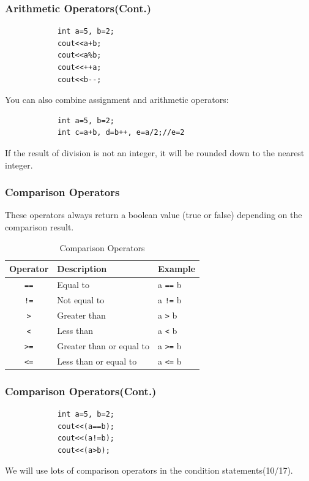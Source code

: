 \documentclass[xcolor=dvipsnames]{beamer}
\begin{document}
    \begin{frame}[fragile]
        \frametitle{Arithmetic Operators(Cont.)}
        \begin{verbatim}
            int a=5, b=2;
            cout<<a+b;
            cout<<a%b;
            cout<<++a;
            cout<<b--;
        \end{verbatim}
        You can also combine assignment and arithmetic operators:
        \begin{verbatim}
            int a=5, b=2;
            int c=a+b, d=b++, e=a/2;//e=2
        \end{verbatim}
        If the result of division is not an integer, it will be rounded down to the nearest integer.
    \end{frame}
    \begin{frame}
        \frametitle{Comparison Operators}
        These operators always return a boolean value (true or false) depending on the comparison result.
        \begin{table}[h]
        \centering
        \caption{Comparison Operators}
        \begin{tabular}{cll}
        \toprule
        \textbf{Operator} & \textbf{Description} & \textbf{Example} \\
         \midrule
            \texttt{==} & Equal to & a \texttt{==} b \\
            \texttt{!=} & Not equal to & a \texttt{!=} b \\
            \texttt{>}  & Greater than & a \texttt{>} b \\
            \texttt{<}  & Less than & a \texttt{<} b \\
            \texttt{>=} & Greater than or equal to & a \texttt{>=} b \\
            \texttt{<=} & Less than or equal to & a \texttt{<=} b \\
        \bottomrule
        \end{tabular}
        \end{table}
    \end{frame}
    \begin{frame}[fragile]
        \frametitle{Comparison Operators(Cont.)}
        \begin{verbatim}
            int a=5, b=2;
            cout<<(a==b);
            cout<<(a!=b);
            cout<<(a>b);
        \end{verbatim}
        We will use lots of comparison operators in the condition statements(10/17).
    \end{frame}
\end{document}
